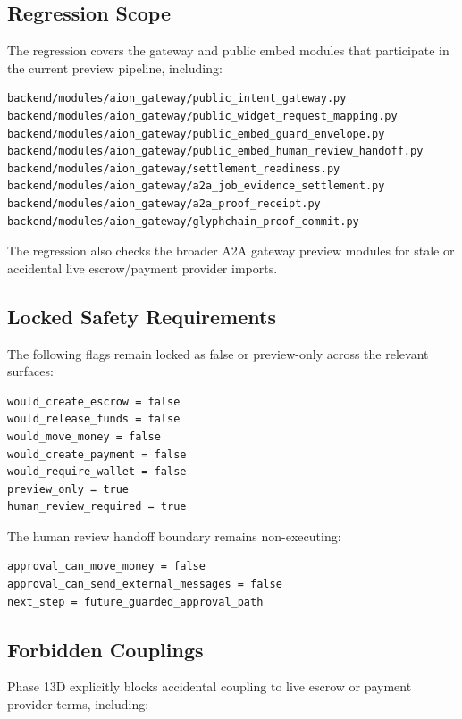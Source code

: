 \subsection{Regression Scope}

The regression covers the gateway and public embed modules that participate in the current preview pipeline, including:

\begin{verbatim}
backend/modules/aion_gateway/public_intent_gateway.py
backend/modules/aion_gateway/public_widget_request_mapping.py
backend/modules/aion_gateway/public_embed_guard_envelope.py
backend/modules/aion_gateway/public_embed_human_review_handoff.py
backend/modules/aion_gateway/settlement_readiness.py
backend/modules/aion_gateway/a2a_job_evidence_settlement.py
backend/modules/aion_gateway/a2a_proof_receipt.py
backend/modules/aion_gateway/glyphchain_proof_commit.py
\end{verbatim}

The regression also checks the broader A2A gateway preview modules for stale or accidental live escrow/payment provider imports.

\subsection{Locked Safety Requirements}

The following flags remain locked as false or preview-only across the relevant surfaces:

\begin{verbatim}
would_create_escrow = false
would_release_funds = false
would_move_money = false
would_create_payment = false
would_require_wallet = false
preview_only = true
human_review_required = true
\end{verbatim}

The human review handoff boundary remains non-executing:

\begin{verbatim}
approval_can_move_money = false
approval_can_send_external_messages = false
next_step = future_guarded_approval_path
\end{verbatim}

\subsection{Forbidden Couplings}

Phase 13D explicitly blocks accidental coupling to live escrow or payment provider terms, including:

